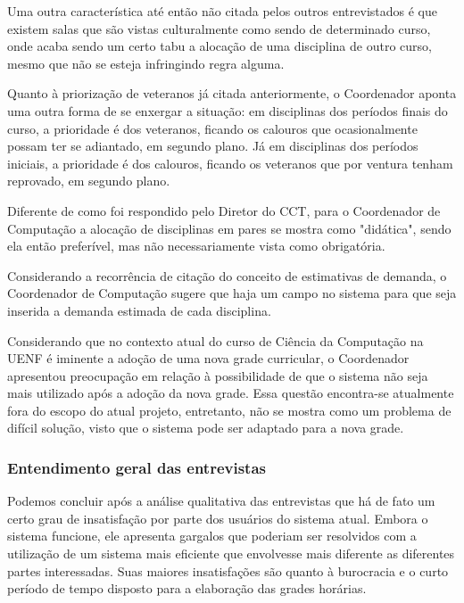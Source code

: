         Uma outra característica até então não citada pelos outros entrevistados é que existem salas que são vistas culturalmente como sendo de determinado curso, onde acaba sendo um certo tabu a alocação de uma disciplina de outro curso, mesmo que não se esteja infringindo regra alguma.

        Quanto à priorização de veteranos já citada anteriormente, o Coordenador aponta uma outra forma de se enxergar a situação: em disciplinas dos períodos finais do curso, a prioridade é dos veteranos, ficando os calouros que ocasionalmente possam ter se adiantado, em segundo plano. Já em disciplinas dos períodos iniciais, a prioridade é dos calouros, ficando os veteranos que por ventura tenham reprovado, em segundo plano.

        Diferente de como foi respondido pelo Diretor do CCT, para o Coordenador de Computação a alocação de disciplinas em pares se mostra como "didática", sendo ela então preferível, mas não necessariamente vista como obrigatória.

        Considerando a recorrência de citação do conceito de estimativas de demanda, o Coordenador de Computação sugere que haja um campo no sistema para que seja inserida a demanda estimada de cada disciplina.

        Considerando que no contexto atual do curso de Ciência da Computação na UENF é iminente a adoção de uma nova grade curricular, o Coordenador apresentou preocupação em relação à possibilidade de que o sistema não seja mais utilizado após a adoção da nova grade. Essa questão encontra-se atualmente fora do escopo do atual projeto, entretanto, não se mostra como um problema de difícil solução, visto que o sistema pode ser adaptado para a nova grade.

    \subsubsection{Entendimento geral das entrevistas} %

        Podemos concluir após a análise qualitativa das entrevistas que há de fato um certo grau de insatisfação por parte dos usuários do sistema atual. Embora o sistema funcione, ele apresenta gargalos que poderiam ser resolvidos com a utilização de um sistema mais eficiente que envolvesse mais diferente as diferentes partes interessadas. Suas maiores insatisfações são quanto à burocracia e o curto período de tempo disposto para a elaboração das grades horárias.


